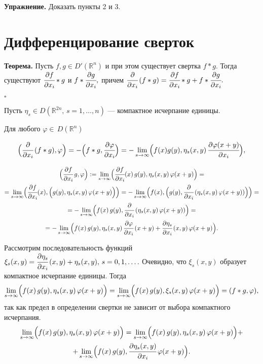 \documentclass[12pt,a4paper,draft]{article}
\DeclareRobustCommand*{\т}{~--- }
\DeclareRobustCommand*{\ч}{~-- }
\begin{document}
\textbf{Упражнение.} Доказать пункты 2 и 3.

\section{Дифференцирование сверток}

\textbf{Теорема.} Пусть $f,g\in D'(\mathbb R^n)$ и при этом
существует свертка $f*g.$ Тогда существуют $\cfrac{\partial
f}{\partial x_i}*g$ и $f*\cfrac{\partial g}{\partial x_i},$ причем
$\cfrac{\partial}{\partial x_i}\,(f*g)=\cfrac{\partial f}{\partial
x_i}*g+ f*\cfrac{\partial g}{\partial x_i}.$

$\square$

Пусть $\eta_s\in D(\mathbb R^{2n},\,s=1,\ldots,n)$ --- компактное
исчерпание единицы.

Для любого $\varphi\in\,D(\mathbb R^n)$

$$\Bigl(\cfrac{\partial}{\partial x_i}\,(f*g),\varphi\Bigr)=
-\Bigl(f*g,\cfrac{\partial \varphi}{\partial x_i}\Bigr)=
-\lim\limits_{s\to\infty}\Bigl(f(x)g(y),\eta_s(x,y)\,\cfrac{\partial
\varphi(x+y)}{\partial x_i} \Bigr),$$

\begin{multline}\Bigl(\cfrac{\partial f}{\partial x_i}\,g,\varphi\Bigr):=
\lim\limits_{s\to\infty}\Bigl( \cfrac{\partial f}{\partial
x_i}(x)\,g(y),\eta_s(x,y)\,\varphi(x+y) \Bigr)=\\=
\lim\limits_{s\to\infty}\Bigl( \cfrac{\partial f}{\partial
x_i}(x),\Bigl(g(y),\eta_s(x,y)\,\varphi(x+y)\Bigr) \Bigr)=
-\lim\limits_{s\to\infty}\Bigl(f(x),\Bigl(g(y),\cfrac{\partial}{\partial
x_i}\,(\eta_s(x,y)\,\varphi(x+y))\Bigr) \Bigr)=\\=
-\lim\limits_{s\to\infty}\Bigl(f(x)\,g(y),\cfrac{\partial}{\partial
x_i}\,(\eta_s(x,y)\,\varphi(x+y))\Bigr)=\\=
-\lim\limits_{s\to\infty}\Bigl(f(x)\,g(y),\eta_s(x,y)\,\cfrac{\partial\varphi}{\partial
x_i}\,(x+y)+ \cfrac{\partial\eta_s}{\partial
x_i}\,(x,y)\,\varphi(x+y)\Bigr).
\end{multline}

Рассмотрим последовательность функций
$\xi_s(x,y)=\cfrac{\partial\eta_s}{\partial x_i}\,(x,y)+
\eta_s(x,y),\,s=0,1,\ldots.$ Очевидно, что $\xi_s(x,y)$ образует
компактное исчерпание единицы. Тогда
$$\lim\limits_{s\to\infty}\Bigl(f(x)\,g(y),\eta_s(x,y)\,\varphi(x+y)\Bigr)=
\lim\limits_{s\to\infty}\Bigl(f(x)\,g(y),\xi_s(x,y)\,\varphi(x+y)\Bigr)=
(f*g,\varphi),$$ так как предел в определении свертки не зависит
от выбора компактного исчерпания.
\begin{multline}
\lim\limits_{s\to\infty}\Bigl(f(x)\,g(y),\eta_s(x,y)\,\varphi(x+y)\Bigr)=
\lim\limits_{s\to\infty}\Bigl(f(x)\,g(y),\eta_s(x,y)\,\varphi(x+y)\Bigr)+\\+
\lim\limits_{s\to\infty}\Bigl(f(x)\,g(y),\cfrac{\partial\eta_s(x,y)}{\partial
x_i}\,\varphi(x+y)\Bigr).\end{multline}
\end{document}
